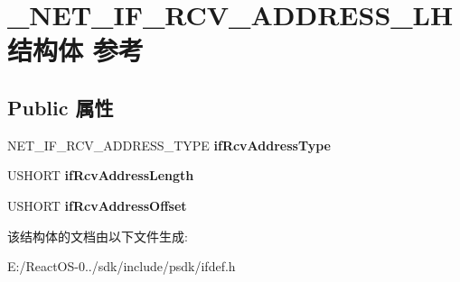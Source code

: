 \hypertarget{struct___n_e_t___i_f___r_c_v___a_d_d_r_e_s_s___l_h}{}\section{\+\_\+\+N\+E\+T\+\_\+\+I\+F\+\_\+\+R\+C\+V\+\_\+\+A\+D\+D\+R\+E\+S\+S\+\_\+\+L\+H结构体 参考}
\label{struct___n_e_t___i_f___r_c_v___a_d_d_r_e_s_s___l_h}
\subsection*{Public 属性}
\begin{DoxyCompactItemize}
\item 
\mbox{\label{struct___n_e_t___i_f___r_c_v___a_d_d_r_e_s_s___l_h_a24df03eecad48f4d52abdf5d38ad0954}} 
N\+E\+T\+\_\+\+I\+F\+\_\+\+R\+C\+V\+\_\+\+A\+D\+D\+R\+E\+S\+S\+\_\+\+T\+Y\+PE {\bfseries if\+Rcv\+Address\+Type}
\item 
\mbox{\label{struct___n_e_t___i_f___r_c_v___a_d_d_r_e_s_s___l_h_ad423a0e6fc62c281c61e1703e8b8bddd}} 
U\+S\+H\+O\+RT {\bfseries if\+Rcv\+Address\+Length}
\item 
\mbox{\label{struct___n_e_t___i_f___r_c_v___a_d_d_r_e_s_s___l_h_a9ba99e7c2ea2c15d22144f043a08eb0f}} 
U\+S\+H\+O\+RT {\bfseries if\+Rcv\+Address\+Offset}
\end{DoxyCompactItemize}


该结构体的文档由以下文件生成\+:\begin{DoxyCompactItemize}
\item 
E\+:/\+React\+O\+S-\/0../sdk/include/psdk/ifdef.\+h\end{DoxyCompactItemize}
